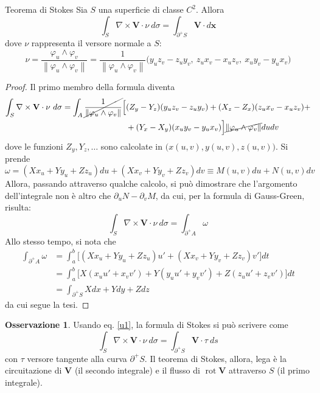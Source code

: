\documentclass[10pt, a4paper]{scrartcl}
\theoremstyle{definition}
\numberwithin{esempio}{section}
\theoremstyle{definition}
\newtheorem{obs}{Osservazione}
\numberwithin{obs}{section}
\numberwithin{nota}{section}
\numberwithin{equation}{subsection}
\begin{document}
\begin{teorema}
	{Teorema di Stokes}{}
	Sia $S$ una superficie di classe $C^2$. Allora
	\begin{equation}
		\int_{S} \nabla \times \mathbf{V} \cdot \nu \ d\sigma = \int_{\partial ^+ S} \mathbf{V} \cdot d\mathbf{x} 
	\end{equation}
	dove $\nu $ rappresenta il versore normale a $S$:
	\[
	\nu = \frac{\varphi _u \wedge \varphi _v}{\left\lVert \varphi _u \wedge \varphi _v \right\rVert } = \frac{1}{\left\lVert \varphi _u \wedge \varphi _v \right\rVert } \big( y_uz_v - z_uy_v , \ z_ux_v - x_u z_v, \ x_uy_v - y_ux_v\big)
	\] 
\begin{proof}
Il primo membro della formula diventa	
\[
	\begin{split}
		\int_{S}  \nabla \times  \mathbf{V} \cdot \nu  \ d\sigma  = \int_{A} \cancel{\frac{1}{\left\lVert \varphi _u\wedge \varphi _v \right\rVert }}\Big[&(Z_y - Y_z) (y_uz_v-z_uy_v)+(X_z-Z_x)(z_ux_v-x_uz_v) + \\
																				  &+ (Y_x - X_y)(x_uy_v-y_ux_v)\Big]\cancel{\left\lVert \varphi _u\wedge \varphi _v \right\rVert}dudv
	\end{split}
\] 
dove le funzioni $Z_y , Y_z, \ldots$ sono calcolate in $\big(x(u,v), y(u,v), z(u,v)\big)$.
Si prende
\[
\omega = (Xx_u  + Yy_u  + Zz_u) du + (Xx_v + Yy_v  + Zz_v) dv \equiv M(u,v) du + N(u,v) dv
\] 
Allora, passando attraverso qualche calcolo, si pu\`o dimostrare che l'argomento dell'integrale non \`e altro che $\partial _u N - \partial _v M$, da cui, per la formula di Gauss-Green, risulta:
\[
	\int_{S}  \nabla \times \mathbf{V} \cdot \nu  \ d\sigma = \int_{\partial ^+ A}  \omega 
\] 
Allo stesso tempo, si nota che 
\[
\begin{split}
	\int_{\partial ^+ A}  \omega &=  \int_{a} ^b \Big[(Xx_u+Yy_u+Zz_u)u' + (Xx_v + Yy_v + Zz_v) v'\Big]dt\\
				     &=\int_{a} ^b \Big[X(x_u u' + x_vv') + Y (y_uu' + y_v v') + Z (z_uu'+z_v v')\Big] dt \\
				     &= \int_{\partial ^+ S} Xdx + Y dy + Zdz 
\end{split}
\] 
da cui segue la tesi.
\end{proof}	
\end{teorema}
\begin{obs}
Usando eq. \ref{u1}, la formula di Stokes si pu\`o scrivere come
\begin{equation}
	\int_{S}  \nabla \times \mathbf{V}  \cdot \nu  \ d\sigma = \int_{\partial ^+ S} \mathbf{V} \cdot \tau \ ds
\end{equation}
con $\tau $ versore tangente alla curva $\partial ^+ S$.
Il teorema di Stokes, allora, lega \`e la circuitazione di $\mathbf{V} $ (il secondo integrale) e il flusso di $\operatorname{rot} \mathbf{V}  $ attraverso $S$ (il primo integrale).
\end{obs}
\end{document}
